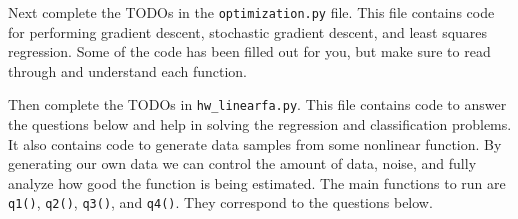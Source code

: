 \documentclass{article}
\begin{document}
Next complete the TODOs in the \texttt{optimization.py} file. This file contains code for performing gradient descent, stochastic gradient descent, and least squares regression. Some of the code has been filled out for you, but make sure to read through and understand each function. 

Then complete the TODOs in \texttt{hw\_linearfa.py}. This file contains code to answer the questions below and help in solving the regression and classification problems. It also contains code to generate data samples from some nonlinear function. By generating our own data we can control the amount of data, noise, and fully analyze how good the function is being estimated. The main functions to run are \texttt{q1()}, \texttt{q2()}, \texttt{q3()}, and \texttt{q4()}. They correspond to the questions below. 
\end{document}
